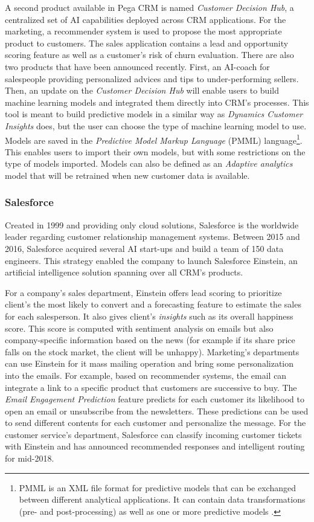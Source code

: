 A second product available in Pega CRM is named \textit{Customer Decision Hub}, a centralized set of AI capabilities deployed across CRM applications. For the marketing, a recommender system is used to propose the most appropriate product to customers. The sales application contains a lead and opportunity scoring feature as well as a customer's risk of churn evaluation. There are also two products that have been announced recently. First, an AI-coach for salespeople providing personalized advices and tips to under-performing sellers. Then, an update on the \textit{Customer Decision Hub} will enable users to build machine learning models and integrated them directly into CRM's processes. This tool is meant to build predictive models in a similar way as \textit{Dynamics Customer Insights} does, but the user can choose the type of machine learning model to use. Models are saved in the \textit{Predictive Model Markup Language} (PMML) language\footnote{PMML is an XML file format for predictive models that can be exchanged between different analytical applications. It can contain data transformations (pre- and post-processing) as well as one or more predictive models \cite{pmml}.}. This enables users to import their own models, but with some restrictions on the type of models imported. Models can also be defined as an \textit{Adaptive analytics} model that will be retrained when new customer data is available.

\subsubsection*{Salesforce}
Created in 1999 and providing only cloud solutions, Salesforce is the worldwide leader regarding customer relationship management systems. Between 2015 and 2016, Salesforce acquired several AI start-ups and build a team of 150 data engineers. This strategy enabled the company to launch Salesforce Einstein, an artificial intelligence solution spanning over all CRM's products.

For a company's sales department, Einstein offers lead scoring to prioritize client's the most likely to convert and a forecasting feature to estimate the sales for each salesperson. It also gives client's \textit{insights} such as its overall happiness score. This score is computed with sentiment analysis on emails but also company-specific information based on the news (for example if its share price falls on the stock market, the client will be unhappy). Marketing's departments can use Einstein for it mass mailing operation and bring some personalization into the emails. For example, based on recommender systems, the email can integrate a link to a specific product that customers are successive to buy. The \textit{Email Engagement Prediction} feature predicts for each customer its likelihood to open an email or unsubscribe from the newsletters. These predictions can be used to send different contents for each customer and personalize the message. For the customer service's department, Salesforce can classify incoming customer tickets with Einstein and has announced recommended responses and intelligent routing for mid-2018.

